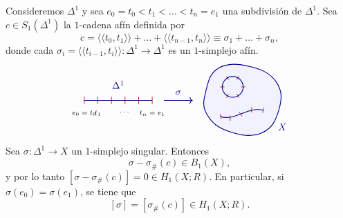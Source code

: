 \begin{lema}[Lema 1]
Consideremos $\Delta^1$ y sea $e_0 = t_0 < t_1 < \dots < t_n = e_1$ una subdivisión de $\Delta^1$. Sea $c \in S_1(\Delta^1)$ la $1$-cadena afín definida por
\[
c = \langle\!\langle t_0, t_1 \rangle\!\rangle + \dots + \langle\!\langle t_{n-1}, t_n \rangle\!\rangle \equiv \sigma_1 + \dots + \sigma_n,
\]
donde cada $\sigma_i = \langle\!\langle t_{i-1}, t_i \rangle\!\rangle \colon \Delta^1 \to \Delta^1$ es un $1$-simplejo afín.
\[
\begin{tikzpicture}[baseline=(current bounding box.center), scale=0.95]
    \draw[thick, blue!55!black] (0, 0) -- (2.6, 0);
    \foreach \x in {0, 0.52, 1.04, 1.56, 2.08, 2.60}{
        \draw[semithick, red!65!black] (\x, -0.14) -- (\x, 0.14);
    }
    \node[blue!55!black, above=6pt] at (1.30, 0.10) {$\Delta^1$};
    \node[below=5pt] at (0.00, -0.08) {\scriptsize $e_0 = t_0$};
    \node[below=5pt] at (0.52, -0.08) {\scriptsize $t_1$};
    \node[below=5pt] at (1.56, -0.08) {\scriptsize $\cdots$};
    \node[below=5pt] at (2.60, -0.08) {\scriptsize $t_n = e_1$};

    \draw[->, thick, blue!55!black] (3.05, 0) -- (4.15, 0)
        node[midway, above=2pt] {$\sigma$};

    \begin{scope}[xshift=6.0cm]
        \filldraw[thick, blue!55!black, fill=blue!5]
            plot[smooth cycle, tension=0.75] coordinates {
                (-1.35,  0.35) (-0.85,  1.25) ( 0.35,  1.30)
                ( 1.35,  0.70) ( 1.45, -0.35) ( 0.80, -1.25)
                (-0.45, -1.20) (-1.30, -0.55)
            };

        \draw[thick, blue!55!black] (-0.32, 0.52) circle (0.40);
        \foreach \ang in {0, 60, 120, 180, 240, 300}{
            \draw[semithick, red!65!black]
                (-0.32, 0.52) ++(\ang:0.32) -- ++(\ang:0.16);
        }

        \draw[thick, blue!55!black]
            (-0.78, -0.62) .. controls (-0.25, -0.82) and (0.25, -0.22) .. (0.85, -0.38);
        \foreach \px/\py/\ang in {
            -0.78/-0.62/105,
            -0.42/-0.68/95,
            -0.02/-0.53/125,
             0.40/-0.36/85,
             0.85/-0.38/75
        }{
            \draw[semithick, red!65!black]
                (\px, \py) ++(\ang:-0.10) -- ++(\ang:0.20);
        }

        \node[blue!55!black] at (1.58, -1.02) {$X$};
    \end{scope}
\end{tikzpicture}
\]
Sea $\sigma \colon \Delta^1 \to X$ un $1$-simplejo singular. Entonces
\[
\sigma - \sigma_\#(c) \in B_1(X),
\]
y por lo tanto $[\sigma - \sigma_\#(c)] = 0 \in H_1(X; R)$. En particular, si $\sigma(e_0) = \sigma(e_1)$, se tiene que
\[
[\sigma] = [\sigma_\#(c)] \in H_1(X; R).
\]
\end{lema}

